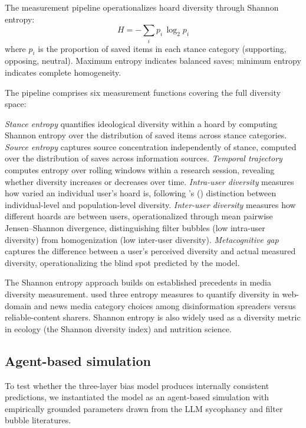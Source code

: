 \documentclass[12pt,a4paper]{article}
\begin{document}
The measurement pipeline operationalizes hoard diversity through Shannon entropy:
\begin{equation}
  H = -\sum_{i} p_i \, \log_2 p_i
  \label{eq:shannon}
\end{equation}
where $p_i$ is the proportion of saved items in each stance category (supporting, opposing, neutral).
Maximum entropy indicates balanced saves; minimum entropy indicates complete homogeneity.

The pipeline comprises six measurement functions covering the full diversity space:

\emph{Stance entropy} quantifies ideological diversity within a hoard by computing Shannon entropy over the distribution of saved items across stance categories.
\emph{Source entropy} captures source concentration independently of stance, computed over the distribution of saves across information sources.
\emph{Temporal trajectory} computes entropy over rolling windows within a research session, revealing whether diversity increases or decreases over time.
\emph{Intra-user diversity} measures how varied an individual user's hoard is, following \citeauthor{Anwar2024}'s (\citeyear{Anwar2024}) distinction between individual-level and population-level diversity.
\emph{Inter-user diversity} measures how different hoards are between users, operationalized through mean pairwise Jensen--Shannon divergence, distinguishing filter bubbles (low intra-user diversity) from homogenization (low inter-user diversity).
\emph{Metacognitive gap} captures the difference between a user's perceived diversity and actual measured diversity, operationalizing the blind spot predicted by the model.

The Shannon entropy approach builds on established precedents in media diversity measurement.
\citet{Bertani2024} used three entropy measures to quantify diversity in web-domain and news media category choices among disinformation spreaders versus reliable-content sharers.
Shannon entropy is also widely used as a diversity metric in ecology (the Shannon diversity index) and nutrition science.


\subsection{Agent-based simulation}

To test whether the three-layer bias model produces internally consistent predictions, we instantiated the model as an agent-based simulation with empirically grounded parameters drawn from the LLM sycophancy and filter bubble literatures.
\end{document}
